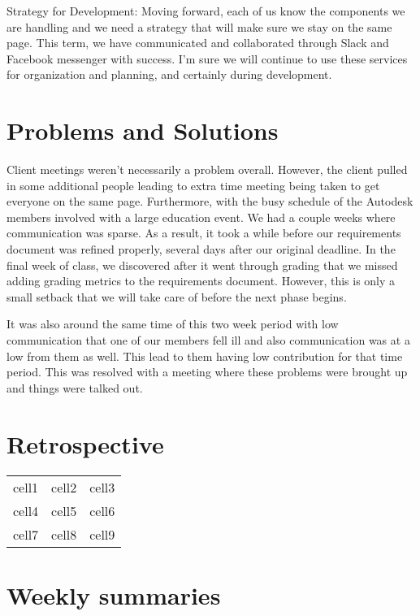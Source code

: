 \documentclass[10pt,draftclsnofoot,onecolumn]{IEEEtran}
\begin{document}
Strategy for Development:
Moving forward, each of us know the components we are handling and we need a strategy that will make sure we stay on the same page. This term, we have communicated and collaborated through Slack and Facebook messenger with success. I'm sure we will continue to use these services for organization and planning, and certainly during development.


\section{Problems and Solutions}
Client meetings weren’t necessarily a problem overall. However, the client pulled in some additional people leading to extra time meeting being taken to get everyone on the same page. Furthermore, with the busy schedule of the Autodesk members involved with a large education event. We had a couple weeks where communication was sparse. As a result, it took a while before our requirements document was refined properly, several days after our original deadline. In the final week of class, we discovered after it went through grading that we missed adding grading metrics to the requirements document. However, this is only a small setback that we will take care of before the next phase begins. 


It was also around the same time of this two week period with low communication that one of our members fell ill and also communication was at a low from them as well. This lead to them having low contribution for that time period. This was resolved with a meeting where these problems were brought up and things were talked out.

\section{Retrospective}

\begin{center}
\begin{tabular}{ |c|c|c| } 
 \hline
 cell1 & cell2 & cell3 \\ 
 cell4 & cell5 & cell6 \\ 
 cell7 & cell8 & cell9 \\ 
 \hline
\end{tabular}
\end{center}

\section{Weekly summaries}
\end{document}
